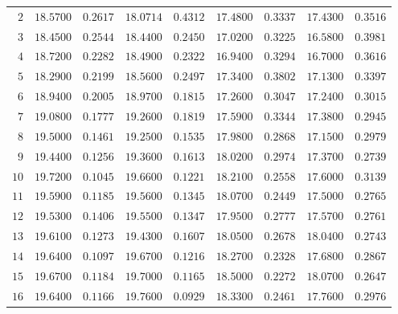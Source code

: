 \begin{table}[ht!]
\begin{tabular}{|r|r@{$\,\pm\,$}l
											|r@{$\,\pm\,$}l
											|r@{$\,\pm\,$}l
											|r@{$\,\pm\,$}l|}
\hline
  $ 2 $  &  $ 18.5700 $  &  $ 0.2617 $  &  $ 18.0714 $  &  $ 0.4312 $  &  $ 17.4800 $  &  $ 0.3337 $  &  $ 17.4300 $  &  $ 0.3516 $ \\
  $ 3 $  &  $ 18.4500 $  &  $ 0.2544 $  &  $ 18.4400 $  &  $ 0.2450 $  &  $ 17.0200 $  &  $ 0.3225 $  &  $ 16.5800 $  &  $ 0.3981 $ \\
  $ 4 $  &  $ 18.7200 $  &  $ 0.2282 $  &  $ 18.4900 $  &  $ 0.2322 $  &  $ 16.9400 $  &  $ 0.3294 $  &  $ 16.7000 $  &  $ 0.3616 $ \\
  $ 5 $  &  $ 18.2900 $  &  $ 0.2199 $  &  $ 18.5600 $  &  $ 0.2497 $  &  $ 17.3400 $  &  $ 0.3802 $  &  $ 17.1300 $  &  $ 0.3397 $ \\
  $ 6 $  &  $ 18.9400 $  &  $ 0.2005 $  &  $ 18.9700 $  &  $ 0.1815 $  &  $ 17.2600 $  &  $ 0.3047 $  &  $ 17.2400 $  &  $ 0.3015 $ \\
  $ 7 $  &  $ 19.0800 $  &  $ 0.1777 $  &  $ 19.2600 $  &  $ 0.1819 $  &  $ 17.5900 $  &  $ 0.3344 $  &  $ 17.3800 $  &  $ 0.2945 $ \\
  $ 8 $  &  $ 19.5000 $  &  $ 0.1461 $  &  $ 19.2500 $  &  $ 0.1535 $  &  $ 17.9800 $  &  $ 0.2868 $  &  $ 17.1500 $  &  $ 0.2979 $ \\
  $ 9 $  &  $ 19.4400 $  &  $ 0.1256 $  &  $ 19.3600 $  &  $ 0.1613 $  &  $ 18.0200 $  &  $ 0.2974 $  &  $ 17.3700 $  &  $ 0.2739 $ \\
  $ 10 $  &  $ 19.7200 $  &  $ 0.1045 $  &  $ 19.6600 $  &  $ 0.1221 $  &  $ 18.2100 $  &  $ 0.2558 $  &  $ 17.6000 $  &  $ 0.3139 $ \\
  $ 11 $  &  $ 19.5900 $  &  $ 0.1185 $  &  $ 19.5600 $  &  $ 0.1345 $  &  $ 18.0700 $  &  $ 0.2449 $  &  $ 17.5000 $  &  $ 0.2765 $ \\
  $ 12 $  &  $ 19.5300 $  &  $ 0.1406 $  &  $ 19.5500 $  &  $ 0.1347 $  &  $ 17.9500 $  &  $ 0.2777 $  &  $ 17.5700 $  &  $ 0.2761 $ \\
  $ 13 $  &  $ 19.6100 $  &  $ 0.1273 $  &  $ 19.4300 $  &  $ 0.1607 $  &  $ 18.0500 $  &  $ 0.2678 $  &  $ 18.0400 $  &  $ 0.2743 $ \\
  $ 14 $  &  $ 19.6400 $  &  $ 0.1097 $  &  $ 19.6700 $  &  $ 0.1216 $  &  $ 18.2700 $  &  $ 0.2328 $  &  $ 17.6800 $  &  $ 0.2867 $ \\
  $ 15 $  &  $ 19.6700 $  &  $ 0.1184 $  &  $ 19.7000 $  &  $ 0.1165 $  &  $ 18.5000 $  &  $ 0.2272 $  &  $ 18.0700 $  &  $ 0.2647 $ \\
  $ 16 $  &  $ 19.6400 $  &  $ 0.1166 $  &  $ 19.7600 $  &  $ 0.0929 $  &  $ 18.3300 $  &  $ 0.2461 $  &  $ 17.7600 $  &  $ 0.2976 $ \\

\end{tabular}
\end{table}
